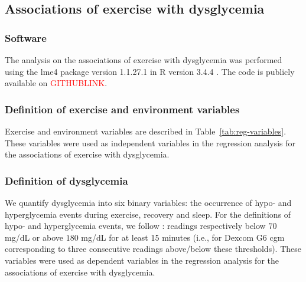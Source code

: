 \documentclass[11pt,a4paper]{article}
\newcommand\TODO[1]{\textcolor{red}{#1}}
\begin{document}
\newpage
\subsection{Associations of exercise with dysglycemia} 
\subsubsection{Software} The analysis on the associations of exercise with dysglycemia was performed using the lme4 package version 1.1.27.1 \cite{lme4} in R version 3.4.4 \cite{R}. The code is publicly available on \TODO{GITHUBLINK}.

\subsubsection{Definition of exercise and environment variables}
Exercise and environment variables are described in Table~\ref{tab:reg-variables}. These variables were used as independent variables in the regression analysis for the associations of exercise with dysglycemia.

\subsubsection{Definition of dysglycemia} We quantify dysglycemia into six binary variables: the occurrence of hypo- and hyperglycemia events during exercise, recovery and sleep. For the definitions of hypo- and hyperglycemia events, we follow \citet{29162583}: readings respectively below $70$ mg/dL or above $180$ mg/dL for at least 15 minutes (i.e., for Dexcom G6 \gls{cgm} corresponding to three consecutive readings above/below these thresholds). These variables were used as dependent variables in the regression analysis for the associations of exercise with dysglycemia.
\end{document}
